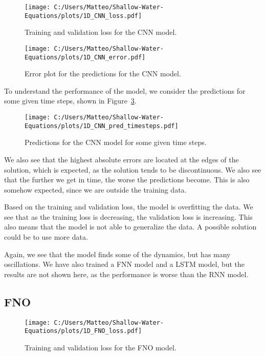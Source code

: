 \begin{figure}[H]
    \centering
    \texttt{[image: C:/Users/Matteo/Shallow-Water-Equations/plots/1D\_CNN\_loss.pdf]}
    \caption{Training and validation loss for the CNN model.}\label{fig:1D_CNN_loss}
\end{figure}


\begin{figure}[H]
    \centering
    \texttt{[image: C:/Users/Matteo/Shallow-Water-Equations/plots/1D\_CNN\_error.pdf]}
    \caption{Error plot for the predictions for the CNN model.}\label{fig:1D_CNN_error}
\end{figure}

To understand the performance of the model, we consider the predictions for some given time steps, shown in Figure~\ref{fig:1D_CNN_pred_timesteps}.

\begin{figure}[H]
    \centering
    \texttt{[image: C:/Users/Matteo/Shallow-Water-Equations/plots/1D\_CNN\_pred\_timesteps.pdf]}
    \caption{Predictions for the CNN model for some given time steps.}\label{fig:1D_CNN_pred_timesteps}
\end{figure}

We also see that the highest absolute errors are located at the edges of the solution, which is expected, as the solution tends to be discontinuous.
We also see that the further we get in time, the worse the predictions become. This is also somehow expected, since we are outside the training data.

Based on the training and validation loss, the model is overfitting the data. We see that as the training loss is decreasing, the validation loss is increasing.
This also means that the model is not able to generalize the data.
A possible solution could be to use more data.

Again, we see that the model finds some of the dynamics, but has many oscillations.
We have also trained a FNN model and a LSTM model, but the results are not shown here, as the performance is worse than the RNN model.


\subsection{FNO}

\begin{figure}[H]
    \centering
    \texttt{[image: C:/Users/Matteo/Shallow-Water-Equations/plots/1D\_FNO\_loss.pdf]}
    \caption{Training and validation loss for the FNO model.}\label{fig:1D_FNO_loss}
\end{figure}

